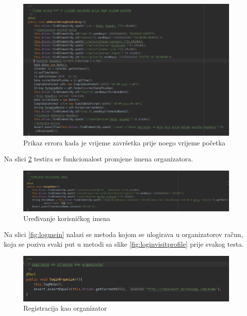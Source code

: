 \begin{figure}[H]
	\includegraphics[scale=0.4]{slike/addEventWrongDateEnding.PNG}
	\centering
	\caption{Prikaz errora kada je vrijeme završetka prije noego vrijeme početka}
	\label{fig:addeventwrong}
\end{figure}


\normalfont\noindent Na slici \ref{fig:changename} testira se funkcionalost promjene imena organizatora.

\begin{figure}[H]
	\includegraphics[scale=0.4]{slike/changeName.PNG}
	\centering
	\caption{Uređivanje korisničkog imena}
	\label{fig:changename}
\end{figure}

\normalfont\noindent Na slici \ref{fig:logmein} nalazi se metoda kojom se ulogirava u organizatorov račun, koja se poziva svaki put u metodi sa slike \ref{fig:loginvisitprofile} prije svakog testa.

\begin{figure}[H]
	\includegraphics[scale=0.4]{slike/loginOrganizer.PNG}
	\centering
	\caption{Registracija kao organizator}
	\label{fig:loginOrganizer}
\end{figure}

